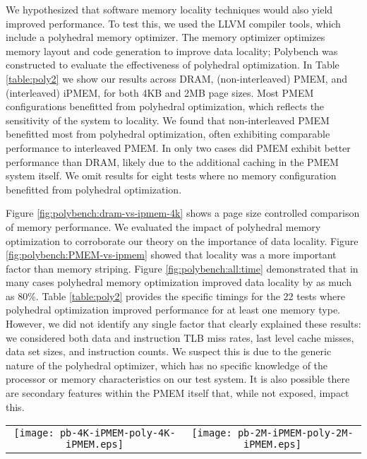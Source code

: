 We hypothesized that software memory locality techniques would also yield improved performance.  To test this, we used the LLVM compiler tools, which include a polyhedral memory optimizer. The memory optimizer optimizes memory layout and code generation to improve data locality; Polybench was constructed to evaluate the effectiveness of polyhedral optimization.  In Table \ref{table:poly2} we show our results across DRAM, (non-interleaved) PMEM, and (interleaved) iPMEM, for both 4KB and 2MB page sizes.  Most PMEM configurations benefitted from polyhedral optimization, which reflects the sensitivity of the system to locality. We found that non-interleaved PMEM benefitted most from polyhedral optimization, often exhibiting comparable performance to interleaved PMEM.  In only two cases did PMEM exhibit better performance than DRAM, likely due to the additional caching in the PMEM system itself. We omit results for eight tests where no memory configuration benefitted from polyhedral optimization.

Figure \ref{fig:polybench:dram-vs-ipmem-4k} shows a page size controlled comparison of memory performance.  We evaluated the impact of polyhedral memory optimization to corroborate our theory on the importance of data locality.  Figure \ref{fig:polybench:PMEM-vs-ipmem} showed that locality was a more important factor than memory striping. Figure \ref{fig:polybench:all:time} demonstrated that in many cases polyhedral memory optimization improved data locality by as much as 80\%.  Table \ref{table:poly2} provides the specific timings for the 22 tests where polyhedral optimization improved performance for at least one memory type.  However, we did not identify any single factor that clearly explained these results: we considered both data and instruction TLB miss rates, last level cache misses, data set sizes, and instruction counts. We suspect this is due to the generic nature of the polyhedral optimizer, which has no specific knowledge of the processor or memory characteristics on our test system. It is also possible there are secondary features within the PMEM itself that, while not exposed, impact this.

\begin{figure*}[!th]
  \captionsetup{justification=centering}
  \centering
  \caption{Polyhedral Memory optimizations for interleaved PMEM (iPMEM), 4K and 2M pages.  Varying cache layers impact performance differently. Results sorted by execution time without polyhedral optimization. Boldface indicates improvement with poly optimization.}
  \vspace{0.1cm}
  \label{fig:polybench:all:time}
  \begin{tabular}{cc}
    \texttt{[image: pb-4K-iPMEM-poly-4K-iPMEM.eps]} &
    \texttt{[image: pb-2M-iPMEM-poly-2M-iPMEM.eps]} 
  \end{tabular}
\end{figure*}

